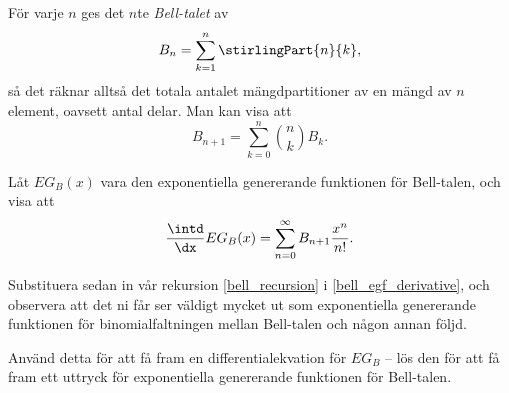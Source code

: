 \documentclass[nobib]{tufte-handout}
\begin{document}
\begin{xca}
  För varje $n$ ges det $n$te \emph{Bell-talet} av
  $$B_n = \sum_{k=1}^{n} \stirlingPart{n}{k},$$
  så det räknar alltså det totala antalet mängdpartitioner av en mängd av $n$ element, oavsett antal delar. Man kan visa att
  \begin{equation}\label{bell_recursion}
    B_{n+1} = \sum_{k=0}^{n} \binom{n}{k} B_k.
  \end{equation}

  Låt $EG_B(x)$ vara den exponentiella genererande funktionen för Bell-talen, och visa att
  \begin{equation}\label{bell_egf_derivative}
    \frac{\intd}{\dx} EG_B(x) = \sum_{n=0}^{\infty} B_{n+1}\frac{x^n}{n!}.
  \end{equation}

  Substituera sedan in vår rekursion \eqref{bell_recursion} i \eqref{bell_egf_derivative}, och observera att det ni får ser väldigt mycket ut som exponentiella genererande funktionen för binomialfaltningen mellan Bell-talen och någon annan följd.

  Använd detta för att få fram en differentialekvation för $EG_B$ -- lös den för att få fram ett uttryck för exponentiella genererande funktionen för Bell-talen.
\end{xca}

%
%
\end{document}
